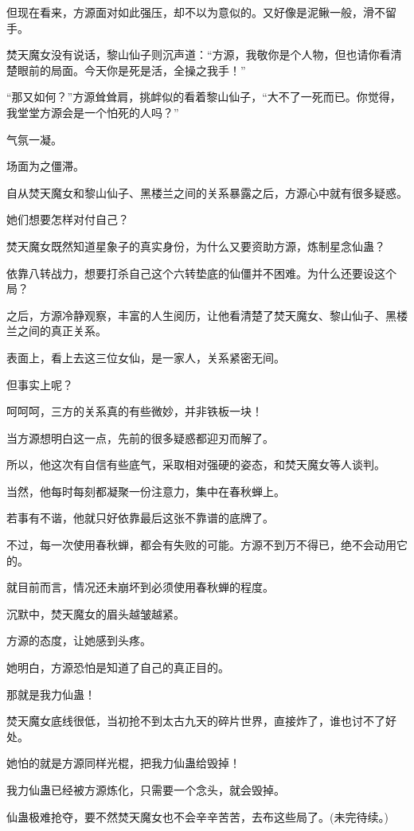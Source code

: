 \begin{this_body}
但现在看来，方源面对如此强压，却不以为意似的。又好像是泥鳅一般，滑不留手。

焚天魔女没有说话，黎山仙子则沉声道：“方源，我敬你是个人物，但也请你看清楚眼前的局面。今天你是死是活，全操之我手！”

“那又如何？”方源耸耸肩，挑衅似的看着黎山仙子，“大不了一死而已。你觉得，我堂堂方源会是一个怕死的人吗？”

气氛一凝。

场面为之僵滞。

自从焚天魔女和黎山仙子、黑楼兰之间的关系暴露之后，方源心中就有很多疑惑。

她们想要怎样对付自己？

焚天魔女既然知道星象子的真实身份，为什么又要资助方源，炼制星念仙蛊？

依靠八转战力，想要打杀自己这个六转垫底的仙僵并不困难。为什么还要设这个局？

之后，方源冷静观察，丰富的人生阅历，让他看清楚了焚天魔女、黎山仙子、黑楼兰之间的真正关系。

表面上，看上去这三位女仙，是一家人，关系紧密无间。

但事实上呢？

呵呵呵，三方的关系真的有些微妙，并非铁板一块！

当方源想明白这一点，先前的很多疑惑都迎刃而解了。

所以，他这次有自信有些底气，采取相对强硬的姿态，和焚天魔女等人谈判。

当然，他每时每刻都凝聚一份注意力，集中在春秋蝉上。

若事有不谐，他就只好依靠最后这张不靠谱的底牌了。

不过，每一次使用春秋蝉，都会有失败的可能。方源不到万不得已，绝不会动用它的。

就目前而言，情况还未崩坏到必须使用春秋蝉的程度。

沉默中，焚天魔女的眉头越皱越紧。

方源的态度，让她感到头疼。

她明白，方源恐怕是知道了自己的真正目的。

那就是我力仙蛊！

焚天魔女底线很低，当初抢不到太古九天的碎片世界，直接炸了，谁也讨不了好处。

她怕的就是方源同样光棍，把我力仙蛊给毁掉！

我力仙蛊已经被方源炼化，只需要一个念头，就会毁掉。

仙蛊极难抢夺，要不然焚天魔女也不会辛辛苦苦，去布这些局了。(未完待续。)

\end{this_body}

